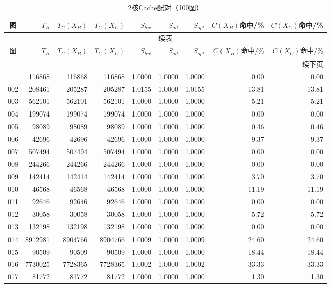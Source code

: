 \begin{longtable}{crrrrrrrr}
\caption{2核Cache配对（100图）}\label{tab:cache-detail-2}\\
\toprule
图 & $T_B$ & $T_C(X_B)$ & $T_C(X_C)$ & $S_{hw}$ & $S_{ad}$ & $S_{opt}$ & $C(X_B)$命中/\% & $C(X_C)$命中/\% \\
\midrule
\endfirsthead
\multicolumn{9}{c}{续表}\\
\toprule
图 & $T_B$ & $T_C(X_B)$ & $T_C(X_C)$ & $S_{hw}$ & $S_{ad}$ & $S_{opt}$ & $C(X_B)$命中/\% & $C(X_C)$命中/\% \\
\midrule
\endhead
\midrule\multicolumn{9}{r}{续下页}\\
\endfoot
\bottomrule
\endlastfoot
001 & 116868 & 116868 & 116868 & 1.0000 & 1.0000 & 1.0000 & 0.00 & 0.00 \\
002 & 208461 & 205287 & 205287 & 1.0155 & 1.0000 & 1.0155 & 13.81 & 13.81 \\
003 & 562101 & 562101 & 562101 & 1.0000 & 1.0000 & 1.0000 & 5.21 & 5.21 \\
004 & 199074 & 199074 & 199074 & 1.0000 & 1.0000 & 1.0000 & 0.00 & 0.00 \\
005 & 98089 & 98089 & 98089 & 1.0000 & 1.0000 & 1.0000 & 0.46 & 0.46 \\
006 & 42696 & 42696 & 42696 & 1.0000 & 1.0000 & 1.0000 & 9.37 & 9.37 \\
007 & 507494 & 507494 & 507494 & 1.0000 & 1.0000 & 1.0000 & 0.00 & 0.00 \\
008 & 244266 & 244266 & 244266 & 1.0000 & 1.0000 & 1.0000 & 0.00 & 0.00 \\
009 & 142414 & 142414 & 142414 & 1.0000 & 1.0000 & 1.0000 & 3.70 & 3.70 \\
010 & 46568 & 46568 & 46568 & 1.0000 & 1.0000 & 1.0000 & 11.19 & 11.19 \\
011 & 92646 & 92646 & 92646 & 1.0000 & 1.0000 & 1.0000 & 0.00 & 0.00 \\
012 & 30058 & 30058 & 30058 & 1.0000 & 1.0000 & 1.0000 & 5.72 & 5.72 \\
013 & 132198 & 132198 & 132198 & 1.0000 & 1.0000 & 1.0000 & 0.00 & 0.00 \\
014 & 8912981 & 8904766 & 8904766 & 1.0009 & 1.0000 & 1.0009 & 24.60 & 24.60 \\
015 & 90509 & 90509 & 90509 & 1.0000 & 1.0000 & 1.0000 & 18.44 & 18.44 \\
016 & 7730025 & 7728365 & 7728365 & 1.0002 & 1.0000 & 1.0002 & 33.33 & 33.33 \\
017 & 81772 & 81772 & 81772 & 1.0000 & 1.0000 & 1.0000 & 1.30 & 1.30 \\

\end{longtable}
